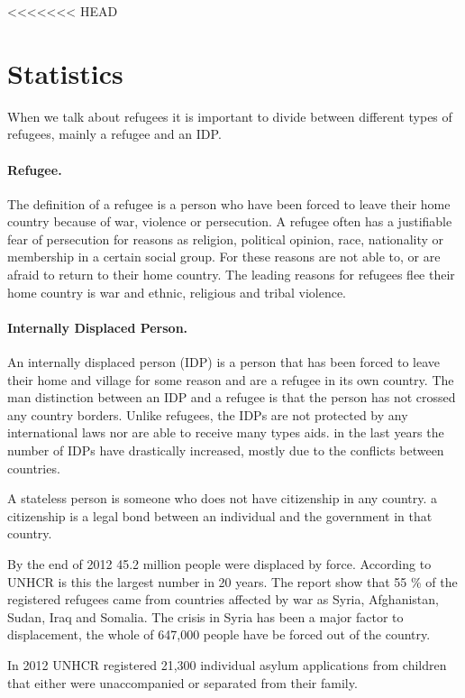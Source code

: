 <<<<<<< HEAD
\section{Statistics}
When we talk about refugees it is important to divide between different types of refugees, mainly a refugee and an IDP. 

\paragraph{Refugee.} The definition of a refugee is a person who have been forced to leave their home country because of war, violence or persecution. A refugee often has a justifiable fear of persecution for reasons as religion, political opinion, race, nationality or membership in a certain social group. For these reasons are not able to, or are afraid to  return to their home country. The leading reasons for refugees flee their home country is war and ethnic, religious and tribal violence\cite{refugeeDef}.

\paragraph{Internally Displaced Person.} An internally displaced person (IDP) is a person that has been forced to leave their home and village for some reason and are a refugee in its own country. The man distinction between an IDP and a refugee is that the person has not crossed any country borders. Unlike refugees, the IDPs are not protected by any international laws nor are able to receive many types aids. in the last years the number of IDPs have drastically increased, mostly due to the conflicts between countries. 

A stateless person is someone who does not have citizenship in any country. a citizenship is a legal bond between an individual and the government in that country. 

By the end of 2012 45.2 million people were displaced by force. According to UNHCR is this the largest number in 20 years. The report show that 55 \% of the registered refugees came from countries affected by war as Syria, Afghanistan, Sudan, Iraq and Somalia. The crisis in Syria has been a major factor to displacement, the whole of 647,000 people have be forced out of the country. \citep{UNHCRstat} 

In 2012 UNHCR registered 21,300 individual asylum applications from children that either were unaccompanied or separated from their family. 



